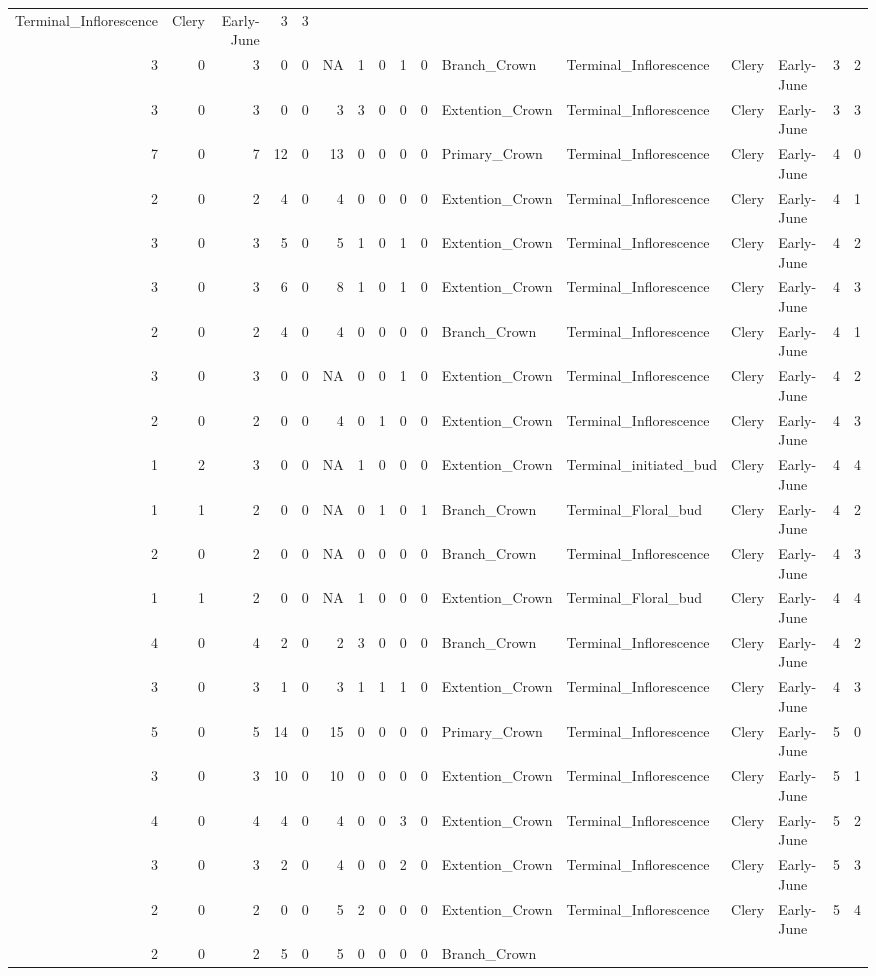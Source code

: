 \documentclass[]{article}
\begin{document}
\begin{longtable}[]{@{}rrrrrrrrrrllllrl@{}}
Terminal\_Inflorescence & Clery & Early-June & 3 & 3\tabularnewline
3 & 0 & 3 & 0 & 0 & NA & 1 & 0 & 1 & 0 & Branch\_Crown &
Terminal\_Inflorescence & Clery & Early-June & 3 & 2\tabularnewline
3 & 0 & 3 & 0 & 0 & 3 & 3 & 0 & 0 & 0 & Extention\_Crown &
Terminal\_Inflorescence & Clery & Early-June & 3 & 3\tabularnewline
7 & 0 & 7 & 12 & 0 & 13 & 0 & 0 & 0 & 0 & Primary\_Crown &
Terminal\_Inflorescence & Clery & Early-June & 4 & 0\tabularnewline
2 & 0 & 2 & 4 & 0 & 4 & 0 & 0 & 0 & 0 & Extention\_Crown &
Terminal\_Inflorescence & Clery & Early-June & 4 & 1\tabularnewline
3 & 0 & 3 & 5 & 0 & 5 & 1 & 0 & 1 & 0 & Extention\_Crown &
Terminal\_Inflorescence & Clery & Early-June & 4 & 2\tabularnewline
3 & 0 & 3 & 6 & 0 & 8 & 1 & 0 & 1 & 0 & Extention\_Crown &
Terminal\_Inflorescence & Clery & Early-June & 4 & 3\tabularnewline
2 & 0 & 2 & 4 & 0 & 4 & 0 & 0 & 0 & 0 & Branch\_Crown &
Terminal\_Inflorescence & Clery & Early-June & 4 & 1\tabularnewline
3 & 0 & 3 & 0 & 0 & NA & 0 & 0 & 1 & 0 & Extention\_Crown &
Terminal\_Inflorescence & Clery & Early-June & 4 & 2\tabularnewline
2 & 0 & 2 & 0 & 0 & 4 & 0 & 1 & 0 & 0 & Extention\_Crown &
Terminal\_Inflorescence & Clery & Early-June & 4 & 3\tabularnewline
1 & 2 & 3 & 0 & 0 & NA & 1 & 0 & 0 & 0 & Extention\_Crown &
Terminal\_initiated\_bud & Clery & Early-June & 4 & 4\tabularnewline
1 & 1 & 2 & 0 & 0 & NA & 0 & 1 & 0 & 1 & Branch\_Crown &
Terminal\_Floral\_bud & Clery & Early-June & 4 & 2\tabularnewline
2 & 0 & 2 & 0 & 0 & NA & 0 & 0 & 0 & 0 & Branch\_Crown &
Terminal\_Inflorescence & Clery & Early-June & 4 & 3\tabularnewline
1 & 1 & 2 & 0 & 0 & NA & 1 & 0 & 0 & 0 & Extention\_Crown &
Terminal\_Floral\_bud & Clery & Early-June & 4 & 4\tabularnewline
4 & 0 & 4 & 2 & 0 & 2 & 3 & 0 & 0 & 0 & Branch\_Crown &
Terminal\_Inflorescence & Clery & Early-June & 4 & 2\tabularnewline
3 & 0 & 3 & 1 & 0 & 3 & 1 & 1 & 1 & 0 & Extention\_Crown &
Terminal\_Inflorescence & Clery & Early-June & 4 & 3\tabularnewline
5 & 0 & 5 & 14 & 0 & 15 & 0 & 0 & 0 & 0 & Primary\_Crown &
Terminal\_Inflorescence & Clery & Early-June & 5 & 0\tabularnewline
3 & 0 & 3 & 10 & 0 & 10 & 0 & 0 & 0 & 0 & Extention\_Crown &
Terminal\_Inflorescence & Clery & Early-June & 5 & 1\tabularnewline
4 & 0 & 4 & 4 & 0 & 4 & 0 & 0 & 3 & 0 & Extention\_Crown &
Terminal\_Inflorescence & Clery & Early-June & 5 & 2\tabularnewline
3 & 0 & 3 & 2 & 0 & 4 & 0 & 0 & 2 & 0 & Extention\_Crown &
Terminal\_Inflorescence & Clery & Early-June & 5 & 3\tabularnewline
2 & 0 & 2 & 0 & 0 & 5 & 2 & 0 & 0 & 0 & Extention\_Crown &
Terminal\_Inflorescence & Clery & Early-June & 5 & 4\tabularnewline
2 & 0 & 2 & 5 & 0 & 5 & 0 & 0 & 0 & 0 & Branch\_Crown &

\end{longtable}
\end{document}
